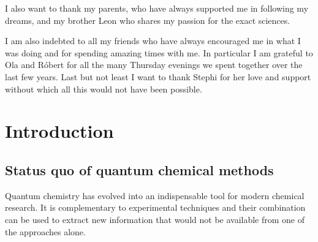 I also want to thank my parents, who have always supported me in following my dreams, and my brother Leon who shares my passion for the exact sciences.

I am also indebted to all my friends who have always encouraged me in what I was doing and for spending amazing times with me. In particular I am grateful to Ola and Róbert for all the many Thursday evenings we spent together over the last few years. Last but not least I want to thank Stephi for her love and support without which all this would not have been possible.

\tableofcontents

\cleardoublepage
{}
\listoftables

\cleardoublepage
{}
\listoffigures

\cleardoublepage
{}
\printnomenclature[3cm]

\chapter{Introduction}

\section{Status quo of quantum chemical methods}
Quantum chemistry has evolved into an indispensable tool for modern chemical research. It is complementary to experimental techniques and their combination can be used to extract new information that would not be available from one of the approaches alone.\cite{Neese_2017_11003}

